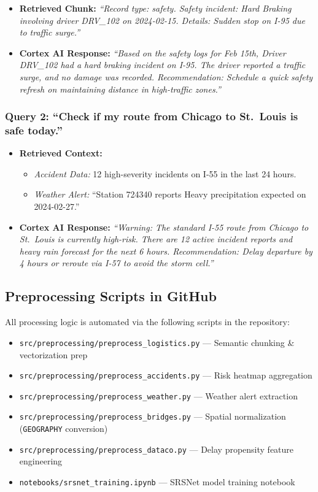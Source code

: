 \documentclass[14.5pt,letterpaper]{article}
\begin{document}
\begin{itemize}
    \item \textbf{Retrieved Chunk:} \textit{``Record type: safety. Safety incident: Hard Braking involving driver DRV\_102 on 2024-02-15. Details: Sudden stop on I-95 due to traffic surge.''}
    \item \textbf{Cortex AI Response:} \textit{``Based on the safety logs for Feb 15th, Driver DRV\_102 had a hard braking incident on I-95. The driver reported a traffic surge, and no damage was recorded. Recommendation: Schedule a quick safety refresh on maintaining distance in high-traffic zones.''}
\end{itemize}

\subsubsection{Query 2: ``Check if my route from Chicago to St.\ Louis is safe today.''}

\begin{itemize}
    \item \textbf{Retrieved Context:}
    \begin{itemize}
        \item \textit{Accident Data:} 12 high-severity incidents on I-55 in the last 24 hours.
        \item \textit{Weather Alert:} ``Station 724340 reports Heavy precipitation expected on 2024-02-27.''
    \end{itemize}
    \item \textbf{Cortex AI Response:} \textit{``Warning: The standard I-55 route from Chicago to St.\ Louis is currently high-risk. There are 12 active incident reports and heavy rain forecast for the next 6 hours. Recommendation: Delay departure by 4 hours or reroute via I-57 to avoid the storm cell.''}
\end{itemize}

\subsection{Preprocessing Scripts in GitHub}

All processing logic is automated via the following scripts in the repository:
\begin{itemize}
    \item \texttt{src/preprocessing/preprocess\_logistics.py} --- Semantic chunking \& vectorization prep
    \item \texttt{src/preprocessing/preprocess\_accidents.py} --- Risk heatmap aggregation
    \item \texttt{src/preprocessing/preprocess\_weather.py} --- Weather alert extraction
    \item \texttt{src/preprocessing/preprocess\_bridges.py} --- Spatial normalization (\texttt{GEOGRAPHY} conversion)
    \item \texttt{src/preprocessing/preprocess\_dataco.py} --- Delay propensity feature engineering
    \item \texttt{notebooks/srsnet\_training.ipynb} --- SRSNet model training notebook
\end{itemize}
\end{document}
